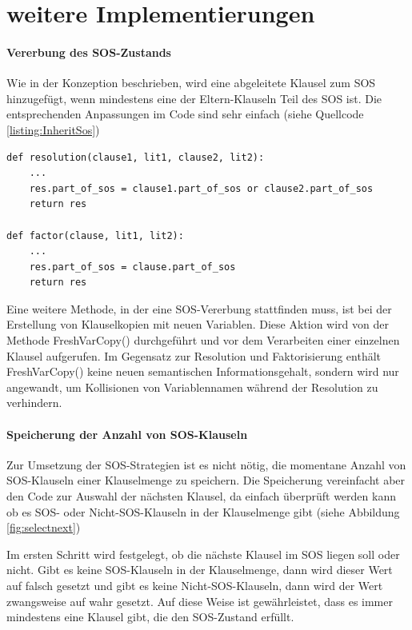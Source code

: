 \section{weitere Implementierungen}
\paragraph{Vererbung des SOS-Zustands}
Wie in der Konzeption beschrieben, wird eine abgeleitete Klausel zum SOS hinzugefügt, wenn mindestens eine der Eltern-Klauseln Teil des SOS ist. Die entsprechenden Anpassungen im Code sind sehr einfach (siehe Quellcode \ref{listing:InheritSos})
\begin{lstlisting}[caption={Implementierung der Vererbung des SOS.Zustands an abgeleitee Klauseln}label={listing:InheritSos}]
def resolution(clause1, lit1, clause2, lit2):
	...
	res.part_of_sos = clause1.part_of_sos or clause2.part_of_sos
	return res
	
def factor(clause, lit1, lit2):
	...
	res.part_of_sos = clause.part_of_sos
	return res
\end{lstlisting}
Eine weitere Methode, in der eine SOS-Vererbung stattfinden muss, ist bei der Erstellung von Klauselkopien mit neuen Variablen. Diese Aktion wird von der Methode FreshVarCopy() durchgeführt und vor dem Verarbeiten einer einzelnen Klausel aufgerufen.
Im Gegensatz zur Resolution und Faktorisierung enthält FreshVarCopy() keine neuen semantischen Informationsgehalt, sondern wird nur angewandt, um Kollisionen von Variablennamen während der Resolution zu verhindern.


\paragraph{Speicherung der Anzahl von SOS-Klauseln}
Zur Umsetzung der SOS-Strategien ist es nicht nötig, die momentane Anzahl von SOS-Klauseln einer Klauselmenge zu speichern. Die Speicherung vereinfacht aber den Code zur Auswahl der nächsten Klausel, da einfach überprüft werden kann ob es SOS- oder Nicht-SOS-Klauseln in der Klauselmenge gibt (siehe Abbildung \ref{fig:selectnext})

Im ersten Schritt wird festgelegt, ob die nächste Klausel im SOS liegen soll oder nicht. Gibt es keine SOS-Klauseln in der Klauselmenge, dann wird dieser Wert auf falsch gesetzt und gibt es keine Nicht-SOS-Klauseln, dann wird der Wert zwangsweise auf wahr gesetzt. Auf diese Weise ist gewährleistet, dass es immer mindestens eine Klausel gibt, die den SOS-Zustand erfüllt. 


